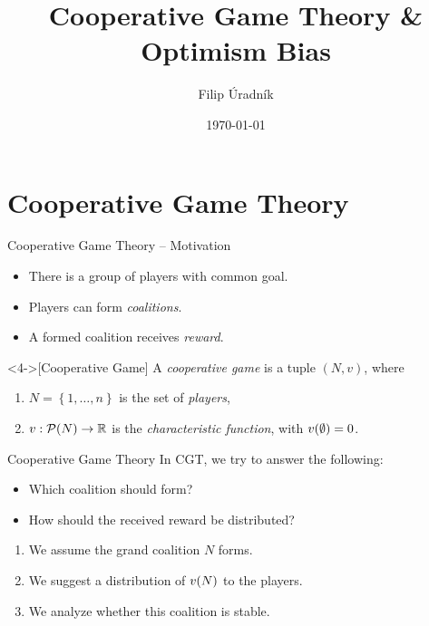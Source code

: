 \documentclass[aspectratio=169]{beamer}
\title{Cooperative Game Theory \& Optimism Bias}
\author{Filip Úradník}
\date{\today}
\begin{document}
\maketitle

\section{Cooperative Game Theory}

\begin{frame}{Cooperative Game Theory -- Motivation}
	\begin{itemize}
		\item<1-> There is a group of players with common goal.
		\item<2-> Players can form \emph{coalitions}.
		\item<3-> A formed coalition receives \emph{reward}.
	\end{itemize}
	\vspace{2em}
	\begin{definition}<4->[Cooperative Game]
		A \emph{cooperative game} is a tuple $ \left( N,v \right) $, where \begin{enumerate}
			\item $ N = \left\{ 1, \ldots, n \right\} $ is the set of \emph{players},
			\item $ v: \mathcal{P}\!\left(N\right) \to \mathbb{R} $ is the \emph{characteristic function}, with $ v\!\left(\emptyset\right) = 0 $.
		\end{enumerate}
	\end{definition}
\end{frame}

\begin{frame}{Cooperative Game Theory}
	In CGT, we try to answer the following:
	\begin{itemize}[ ]
		\item Which coalition should form?
		\item How should the received reward be distributed?
	\end{itemize}
	\begin{enumerate}
		\item<3-> We assume the grand coalition $ N $ forms.
		\item<4-> We suggest a distribution of $ v\!\left(N\right) $ to the players.
		\item<5-> We analyze whether this coalition is stable.
	\end{enumerate}
\end{frame}
\end{document}
